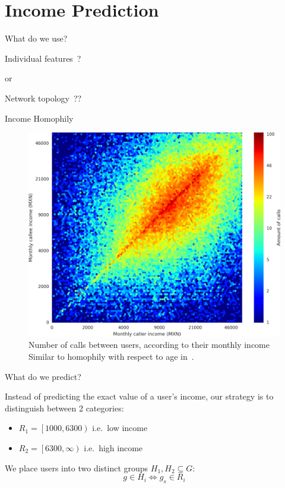 \documentclass[usenames,dvipsnames]{beamer}
\newcommand{\closeopen}[2]{\left[ #1, #2 \right)}
\begin{document}
\section{Income Prediction}

\begin{frame}{What do we use?}

\centering

\begin{LARGE}
Individual features~?

\bigskip

or

\bigskip
\medskip

Network topology~??
\end{LARGE}
\end{frame}


\begin{frame}{Income Homophily}

\begin{figure}[h]
\begin{center}
\includegraphics[width=0.7\columnwidth]{Homophily_income_origin_target_low.png}
\caption{Number of calls between users, according to their monthly income \\
\medskip
{\small Similar to homophily with respect to age in~\cite{brea2014}.}
}
\label{homophily_heatmap}
\end{center}
\end{figure}
\end{frame}

\begin{frame}{What do we predict?}

Instead of predicting the exact value of a user's income, our strategy is to distinguish between 2 categories:
\begin{itemize}
\item $R_1 = \closeopen{1000}{6300}$ i.e.\ low income
\item $R_2 = \closeopen{6300}{\infty}$ i.e.\ high income
\end{itemize} 

\bigskip

We place users into two distinct groups $ H_1, H_2 \subseteq G$:
\[
	g \in H_i \iff g_s \in R_i
\]

\end{frame}
\end{document}
